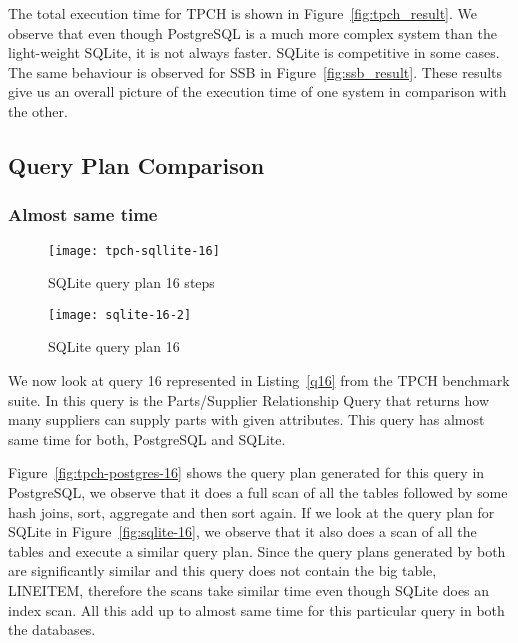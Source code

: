 The total execution time for TPCH is shown in Figure~\ref{fig:tpch_result}. We observe that even though PostgreSQL is a much more complex system than the light-weight SQLite, it is not always faster. SQLite is competitive in some cases. The same behaviour is observed for SSB in Figure~\ref{fig:ssb_result}. These results give us an overall picture of the execution time of one system in comparison with the other.\\


\subsection{Query Plan Comparison}
\label{sec:plan}

\subsubsection{Almost same time}

\begin{figure*}[ht]
\centering
     \begin{subfigure}[b]{0.4\textwidth}
         \centering
         \texttt{[image: tpch-sqllite-16]}
         \caption{SQLite query plan 16 steps}
         \label{fig:tpch-sqllite-16}
     \end{subfigure}
     \hfill
     \begin{subfigure}[b]{0.4\textwidth}
         \centering
         \texttt{[image: sqlite-16-2]}
         \caption{SQLite query plan 16}
         \label{fig:sqlite-16-2}
     \end{subfigure}

        \caption{SQLite plan for query 16}
        \label{fig:sqlite-16}
\end{figure*}

We now look at query 16 represented in Listing~\ref{q16} from the TPCH benchmark suite. In this query is the Parts/Supplier Relationship Query that returns how many suppliers can supply parts with given attributes. This query has almost same time for both, PostgreSQL and SQLite.

Figure~\ref{fig:tpch-postgres-16} shows the query plan generated for this query in PostgreSQL, we observe that it does a full scan of all the tables followed by some hash joins, sort, aggregate and then sort again. If we look at the query plan for SQLite in Figure~\ref{fig:sqlite-16}, we observe that it also does a scan of all the tables and execute a similar query plan. Since the query plans generated by both are significantly similar and this query does not contain the big table, LINEITEM, therefore the scans take similar time even though SQLite does an index scan. All this add up to almost same time for this particular query in both the databases.\\

